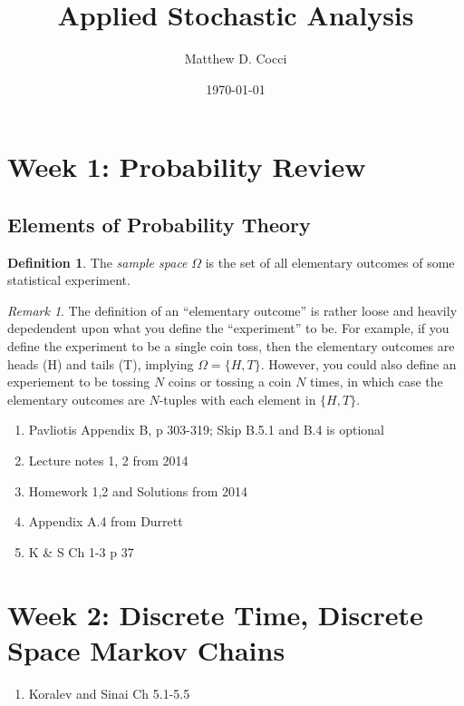 \documentclass[12pt]{article}
\author{Matthew D. Cocci}
\title{Applied Stochastic Analysis}
\date{\today}
\theoremstyle{plain}
\theoremstyle{definition}
\newtheorem{defn}[thm]{Definition}
\theoremstyle{remark}
\newtheorem*{rmk}{Remark}
\begin{document}
\maketitle

\tableofcontents

\clearpage
\section{Week 1: Probability Review}

\subsection{Elements of Probability Theory}

\begin{defn}
The \emph{sample space} $\Omega$ is the set of all elementary outcomes
of some statistical experiment.
\end{defn}
\begin{rmk}
The definition of an ``elementary outcome'' is rather loose and heavily
depedendent upon what you define the ``experiment'' to be. For example,
if you define the experiment to be a single coin toss, then the
elementary outcomes are heads (H) and tails (T), implying $\Omega =
\{H,T\}$. However, you could also define an experiement to be tossing
$N$ coins or tossing a coin $N$ times, in which case the elementary
outcomes are $N$-tuples with each element in $\{H,T\}$.
\end{rmk}



\begin{enumerate}
  \item Pavliotis Appendix B, p 303-319; Skip B.5.1 and B.4 is optional
  \item Lecture notes 1, 2 from 2014
  \item Homework 1,2 and Solutions from 2014
  \item Appendix A.4 from Durrett
  \item K \& S Ch 1-3 p 37
\end{enumerate}

\section{Week 2: Discrete Time, Discrete Space Markov Chains}

\begin{enumerate}
  \item Koralev and Sinai Ch 5.1-5.5
\end{enumerate}
\end{document}
